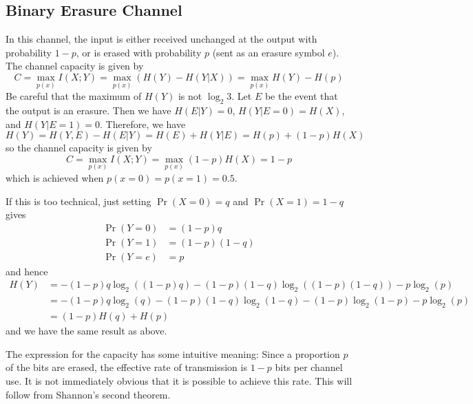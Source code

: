 \documentclass[../main.tex]{subfiles}
\begin{document}
\subsection{Binary Erasure Channel}
In this channel, the input is either received unchanged at the output with probability $1-p$, or is erased with probability $p$ (sent as an erasure symbol $e$). The channel capacity is given by
\begin{equation*}
	C = \max_{p(x)} I(X;Y) = \max_{p(x)} (H(Y) - H(Y|X)) = \max_{p(x)} H(Y) - H(p)
\end{equation*}
Be careful that the maximum of $H(Y)$ is not $\log_2 3$. Let $E$ be the event that the output is an erasure. Then we have $H(E|Y) = 0$, $H(Y|E=0) = H(X)$, and $H(Y|E=1) = 0$. Therefore, we have
\begin{equation*}
	H(Y) = H(Y, E) - H(E|Y) = H(E) + H(Y|E) = H(p) + (1-p)H(X)
\end{equation*}
so the channel capacity is given by
\begin{equation}
	C = \max_{p(x)} I(X;Y) = \max_{p(x)} (1-p)H(X) = 1-p
\end{equation}
which is achieved when $p(x=0) = p(x=1) = 0.5$.
\begin{remark}
	If this is too technical, just setting $\Pr(X=0) = q$ and $\Pr(X=1) = 1-q$ gives
	\begin{equation*}
		\begin{aligned}
			\Pr(Y=0) & = (1-p)q     \\
			\Pr(Y=1) & = (1-p)(1-q) \\
			\Pr(Y=e) & = p
		\end{aligned}
	\end{equation*}
	and hence
	\begin{equation*}
		\begin{aligned}
			H(Y) & = - (1-p)q \log_2((1-p)q) - (1-p)(1-q) \log_2((1-p)(1-q)) - p \log_2(p)        \\
			     & = - (1-p)q \log_2(q) - (1-p)(1-q) \log_2(1-q) - (1-p)\log_2(1-p) - p \log_2(p) \\
			     & = (1-p)H(q) + H(p)
		\end{aligned}
	\end{equation*}
	and we have the same result as above.

	\medskip
	The expression for the capacity has some intuitive meaning: Since a proportion $p$ of the bits are erased, the effective rate of transmission is $1-p$ bits per channel use. It is not immediately obvious that it is possible to achieve this rate. This will follow from Shannon's second theorem.
\end{remark}
\end{document}
